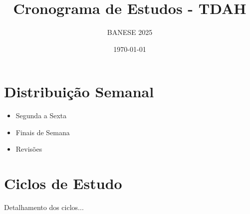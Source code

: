 \documentclass[12pt,a4paper]{article}
\title{Cronograma de Estudos - TDAH}
\author{BANESE 2025}
\date{\today}
\begin{document}
\maketitle

\section{Distribuição Semanal}
\begin{itemize}
    \item Segunda a Sexta
    \item Finais de Semana
    \item Revisões
\end{itemize}

\section{Ciclos de Estudo}
Detalhamento dos ciclos...
\end{document}
